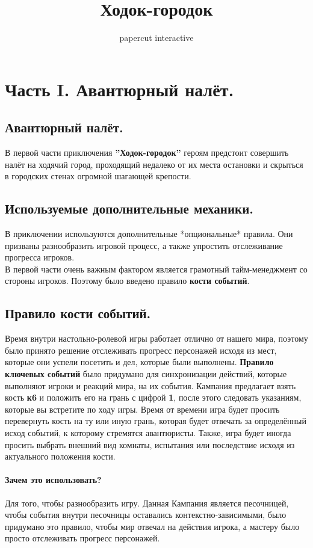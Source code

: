 \documentclass[a4paper,12pt,twoside,twocolumn]{book}
\title{Ходок-городок}
\author{papercut interactive}
\date{}
\begin{document}
\maketitle
\tableofcontents
\section{Часть I. Авантюрный налёт.}
\subsection{Авантюрный налёт.}
В первой части приключения \textbf{''Ходок-городок''} героям предстоит совершить налёт на ходячий город, проходящий недалеко от их места остановки и скрыться в городских стенах 
огромной шагающей крепости.
\subsection{Используемые дополнительные механики.}
В приключении используются дополнительные *опциональные* правила. Они призваны разнообразить игровой процесс, а также упростить отслеживание прогресса игроков. 
\\В первой части очень важным фактором является грамотный тайм-менеджмент со стороны игроков. Поэтому было введено правило \textbf{кости событий}.
\subsection{Правило кости событий.}
Время внутри настольно-ролевой игры работает отлично от нашего мира, поэтому было принято решение отслеживать прогресс персонажей исходя из мест, которые они успели посетить
 и дел, которые были выполнены. \textbf{Правило ключевых событий} было придумано для синхронизации действий, которые выполняют игроки и реакций мира, на их события. Кампания предлагает взять кость \textbf{к6} и положить его на грань с цифрой \textbf{1}, после этого следовать указаниям, которые вы встретите по ходу игры. Время от времени игра будет просить перевернуть кость на ту или иную грань, которая будет отвечать за определённый исход событий, к которому стремятся авантюристы. Также, игра будет иногда просить выбрать внешний вид комнаты, испытания или последствие исходя из актуального положения кости.
\paragraph{Зачем это использовать?}
Для того, чтобы разнообразить игру. Данная Кампания является песочницей, чтобы события внутри песочницы оставались контекстно-зависимыми, было придумано это правило, чтобы мир
 отвечал на действия игрока, а мастеру было просто отслеживать прогресс персонажей.
\end{document}
